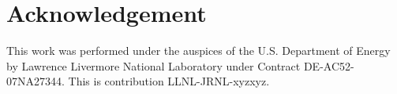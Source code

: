 \section*{Acknowledgement}

This work was performed under the auspices of the U.S. Department of Energy by Lawrence Livermore National Laboratory under Contract DE-AC52-07NA27344. This is contribution LLNL-JRNL-xyzxyz.